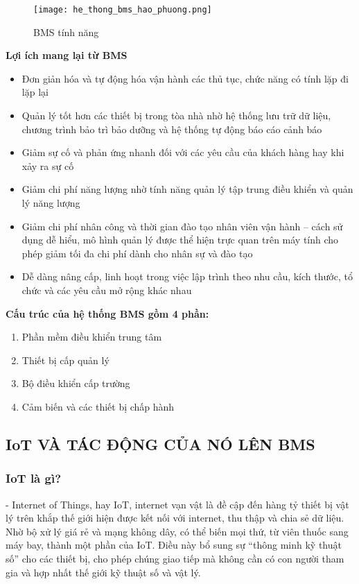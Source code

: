 \begin{figure}[H]
	\centering
	\texttt{[image: he\_thong\_bms\_hao\_phuong.png]}	
	\caption{BMS tính năng}
\end{figure}
	
	\textbf{Lợi ích mang lại từ BMS}
	\begin{itemize}[leftmargin=2cm]
		\item Đơn giản hóa và tự động hóa vận hành các thủ tục, chức năng có tính lặp đi lặp lại
		\item Quản lý tốt hơn các thiết bị trong tòa nhà nhờ hệ thống lưu trữ dữ liệu, chương trình bảo trì bảo dưỡng và hệ thống tự động báo cáo cảnh báo
		\item Giảm sự cố và phản ứng nhanh đối với các yêu cầu của khách hàng hay khi xảy ra sự cố
		\item Giảm chi phí năng lượng nhờ tính năng quản lý tập trung điều khiển và quản lý năng lượng
		\item Giảm chi phí nhân công và thời gian đào tạo nhân viên vận hành – cách sử dụng dễ hiểu, mô hình quản lý được thể hiện trực quan trên máy tính cho phép giảm tối đa chi phí dành cho nhân sự và đào tạo
		\item Dễ dàng nâng cấp, linh hoạt trong việc lập trình theo nhu cầu, kích thước, tổ chức và các yêu cầu mở rộng khác nhau
	\end{itemize}
	
	\textbf{Cấu trúc của hệ thống BMS gồm 4 phần:}
	\begin{enumerate}
		\setlength{\itemindent}{2cm}
		\item Phần mềm điều khiển trung tâm
		\item Thiết bị cấp quản lý
		\item Bộ điều khiển cấp trường
		\item Cảm biến và các thiết bị chấp hành
	\end{enumerate}

	\subsection{IoT VÀ TÁC ĐỘNG CỦA NÓ LÊN BMS}
	\subsubsection{IoT là gì?}
	- Internet of Things, hay IoT, internet vạn vật là đề cập đến hàng tỷ thiết bị vật lý trên khắp thế giới hiện được kết nối với internet, thu thập và chia sẻ dữ liệu. Nhờ bộ xử lý giá rẻ và mạng không dây, có thể biến mọi thứ, từ viên thuốc sang máy bay, thành một phần của IoT. Điều này bổ sung sự “thông minh kỹ thuật số” cho các thiết bị, cho phép chúng giao tiếp mà không cần có con người tham gia và hợp nhất thế giới kỹ thuật số và vật lý.

